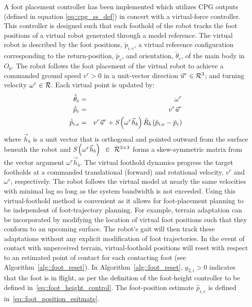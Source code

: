 		A foot placement controller has been implemented which utilizes CPG outputs (defined in equation \ref{eq::cpg_ss_def}) in concert with a virtual-force controller. This controller is designed such that each foothold of the robot tracks the foot positions of a virtual robot generated through a model reference. The virtual robot is described by the foot positions, $\tilde{p}_{i,e}$, a virtual reference configuration corresponding to the return-position, $\tilde{p}_{c}$, and orientation, $\tilde{\theta}_{c}$, of the main body in $O_{0}$. The robot follows the foot placement of the virtual robot to achieve a commanded ground speed $v^{r} > 0$ in a unit-vector direction $\vec{u}^{r} \in {\cal R}^{3}$; and turning velocity $\omega^{r} \in {\cal R}$. Each virtual point is updated by:
		\begin{eqnarray}
			\dot{\tilde{\theta}}_{c}	& = & \omega^{r} 				\nonumber\\
			\dot{\tilde{p}}_{c}			& = & v^{r}\vec{u}^{r}			\nonumber\\
			\dot{\tilde{p}}_{i,e} 		& = & v^{r}\vec{u}^{r} + \emph{S}\left(\omega^{r}\vec{h}_{b}\right) \tilde{R}_{b} \left(\tilde{p}_{i,e}-\tilde{p}_{c} \right) 
			\label{eq::virtual_foothold_control}
		\end{eqnarray}
		where $\vec{h}_{b}$ is a unit vector that is orthogonal and pointed outward from the surface beneath the robot and $\emph{S}\left(\omega^{r}\vec{h}_{b}\right)\text{ }\in\text{ }{\cal R}^{3\times3}$ forms a skew-symmetric matrix from the vector argument $\omega^{r}\vec{h}_{b}$. The virtual foothold dynamics progress the target footholds at a commanded translational (forward) and rotational velocity, $v^{r}$ and $\omega^{r}$, respectively. The robot follows the virtual model at nearly the same velocities with minimal lag so long as the system bandwidth is not exceeded. Using this virtual-foothold method is convenient as it allows for foot-placement planning to be independent of foot-trajectory planning. For example, terrain adaptation can be incorporated by modifying the location of virtual foot positions such that they conform to an upcoming surface. The robot's gait will then track these adaptations without any explicit modification of foot trajectories. In the event of contact with unperceived terrain, virtual-foothold positions will reset with respect to an estimated point of contact for each \Ith contacting foot (see Algorithm~\ref{alg::foot_reset}). In Algorithm~\ref{alg::foot_reset}, $y_{2,i}>0$ indicates that the \Ith foot is in flight, as per the definition of the foot-height controller to be defined in~\ref{eq::foot_height_control}. The foot-position estimate $\hat{p}_{i,e}$ is defined in~\ref{eq::foot_position_esitmate}.

